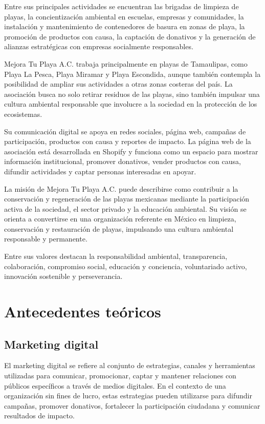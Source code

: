 Entre sus principales actividades se encuentran las brigadas de limpieza de playas, la concientización ambiental en escuelas, empresas y comunidades, la instalación y mantenimiento de contenedores de basura en zonas de playa, la promoción de productos con causa, la captación de donativos y la generación de alianzas estratégicas con empresas socialmente responsables.

Mejora Tu Playa A.C. trabaja principalmente en playas de Tamaulipas, como Playa La Pesca, Playa Miramar y Playa Escondida, aunque también contempla la posibilidad de ampliar sus actividades a otras zonas costeras del país. La asociación busca no solo retirar residuos de las playas, sino también impulsar una cultura ambiental responsable que involucre a la sociedad en la protección de los ecosistemas.

Su comunicación digital se apoya en redes sociales, página web, campañas de participación, productos con causa y reportes de impacto. La página web de la asociación está desarrollada en Shopify y funciona como un espacio para mostrar información institucional, promover donativos, vender productos con causa, difundir actividades y captar personas interesadas en apoyar.

La misión de Mejora Tu Playa A.C. puede describirse como contribuir a la conservación y regeneración de las playas mexicanas mediante la participación activa de la sociedad, el sector privado y la educación ambiental. Su visión se orienta a convertirse en una organización referente en México en limpieza, conservación y restauración de playas, impulsando una cultura ambiental responsable y permanente.

Entre sus valores destacan la responsabilidad ambiental, transparencia, colaboración, compromiso social, educación y conciencia, voluntariado activo, innovación sostenible y perseverancia.

\section{Antecedentes teóricos}

\subsection{Marketing digital}

El marketing digital se refiere al conjunto de estrategias, canales y herramientas utilizadas para comunicar, promocionar, captar y mantener relaciones con públicos específicos a través de medios digitales. En el contexto de una organización sin fines de lucro, estas estrategias pueden utilizarse para difundir campañas, promover donativos, fortalecer la participación ciudadana y comunicar resultados de impacto.

